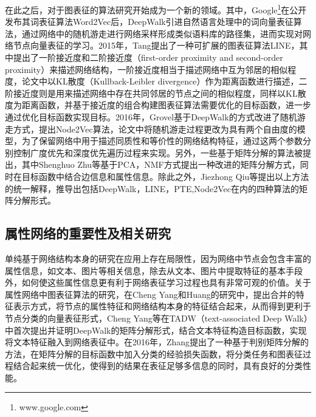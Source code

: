 在此之后，对于图表征的算法研究开始成为一个新的领域。其中，Google\footnote{www.google.com}在公开发布其词表征算法Word2Vec\cite{mikolov2013efficient}后，DeepWalk\cite{perozzi2014deepwalk}引进自然语言处理中的词向量表征算法，通过网络中的随机游走进行网络采样形成类似语料库的路径集，进而实现对网络节点向量表征的学习。2015年，Tang\cite{tang2015line}提出了一种可扩展的图表征算法LINE，其中提出了一阶接近度和二阶接近度（first-order proximity and second-order proximity）来描述网络结构，一阶接近度相当于描述网络中互为邻居的相似程度，论文中以KL散度（Kullback-Leibler divergence）作为距离函数进行描述，二阶接近度则是用来描述网络中存在共同邻居的节点之间的相似程度，同样以KL散度为距离函数，并基于接近度的组合构建图表征算法需要优化的目标函数，进一步通过优化目标函数实现目标。2016年，Grovel\cite{grover2016node2vec}基于DeepWalk的方式改进了随机游走方式，提出Node2Vec算法，论文中将随机游走过程更改为具有两个自由度的模型，为了保留网络中用于描述同质性和等价性的网络结构特征，通过这两个参数分别控制广度优先和深度优先遍历过程来实现。另外，一些基于矩阵分解的算法\cite{ahmed2013distributed,singh2008relational}被提出，其中Shenghuo Zhu等基于PCA，NMF方式提出一种改进的矩阵分解方式，同时在目标函数中结合边信息和属性信息。除此之外，Jiezhong Qiu等\cite{qiu2017network}提出以上方法的统一解释，推导出包括DeepWalk，LINE，PTE\cite{tang2015pte},Node2Vec在内的四种算法的矩阵分解形式。

\subsection{属性网络的重要性及相关研究}

单纯基于网络结构本身的研究在应用上存在局限性，因为网络中节点会包含丰富的属性信息，如文本、图片等相关信息，除去从文本、图片中提取特征的基本手段外，如何使这些属性信息更有利于网络表征学习过程也具有非常可观的价值。关于属性网络中图表征算法的研究，在Cheng Yang\cite{yang2015network}和Huang\cite{huang2017accelerated}的研究中，提出合并的特征表示方式，将节点的属性特征和网络结构本身的特征结合起来，从而得到更利于节点分类的向量表征形式，Cheng Yang等在TADW（text-associated Deep Walk）中首次提出并证明DeepWalk的矩阵分解形式，结合文本特征构造目标函数，实现将文本特征融入到网络表征中。在2016年，Zhang\cite{zhang2016collective}提出了一种基于判别矩阵分解的方法，在矩阵分解的目标函数中加入分类的经验损失函数，将分类任务和图表征过程结合起来统一优化，使得到的结果在表征足够多信息的同时，具有良好的分类性能。


